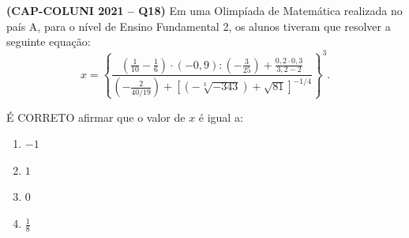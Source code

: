 \textbf{(CAP-COLUNI 2021 -- Q18)} Em uma Olimpíada de Matemática realizada no país A, para o nível de Ensino Fundamental 2, os alunos tiveram que resolver a seguinte equação:
\[
x=
\left\{
\frac{
\left(\frac{1}{10}-\frac{1}{6}\right)\cdot(-0{,}9):\left(-\frac{3}{25}\right)
+\frac{0{,}2\cdot0{,}3}{3{,}2-2}
}{
\left(-\frac{2}{40/19}\right)
+\left[\left(-\sqrt[3]{-343}\right)+\sqrt{81}\right]^{-1/4}
}
\right\}^{3}.
\]

É CORRETO afirmar que o valor de $x$ é igual a:

\begin{enumerate}
	\item $-1$
	\item $1$
	\item $0$
	\item $\frac18$
\end{enumerate}
